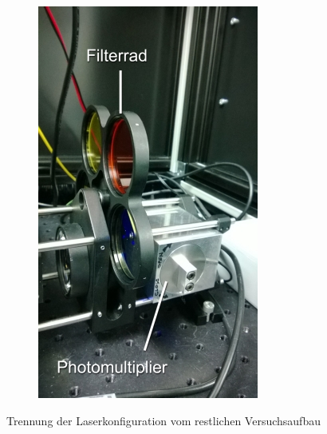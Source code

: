 \begin{figure}
\begin{subfigure}[b]{0.5\linewidth}
\end{subfigure}
\begin{subfigure}[b]{0.5\linewidth}
\includegraphics[width=0.98\linewidth]{IMAGE/pmt.png}\label{fig:pmt}
\end{subfigure}

\caption{Trennung der Laserkonfiguration vom restlichen Versuchsaufbau \cite{Anleitung}}
\end{figure}
\clearpage

